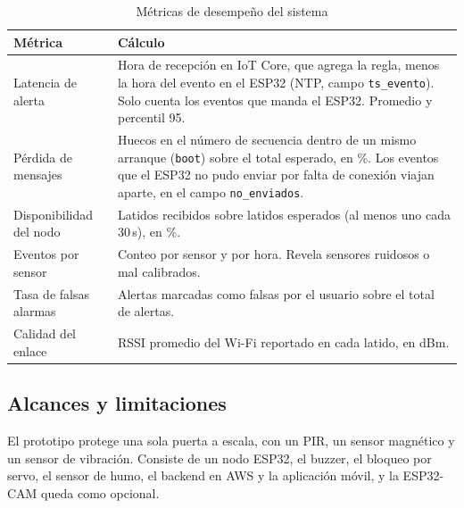 \documentclass[manuscript,screen,nonacm]{acmart}
\begin{document}
\begin{table}[htbp]
\centering
\caption{Métricas de desempeño del sistema}
\label{tab:metricas}
\footnotesize
\renewcommand{\arraystretch}{1.15}
\begin{tabular}{@{}L{3.2cm}L{9.8cm}@{}}
\toprule
\textbf{Métrica} & \textbf{Cálculo} \\
\midrule
Latencia de alerta & Hora de recepción en IoT Core, que agrega la regla, menos la hora del evento en el ESP32 (NTP, campo \texttt{ts\_evento}). Solo cuenta los eventos que manda el ESP32. Promedio y percentil 95. \\
Pérdida de mensajes & Huecos en el número de secuencia dentro de un mismo arranque (\texttt{boot}) sobre el total esperado, en \%. Los eventos que el ESP32 no pudo enviar por falta de conexión viajan aparte, en el campo \texttt{no\_enviados}. \\
Disponibilidad del nodo & Latidos recibidos sobre latidos esperados (al menos uno cada 30\,s), en \%. \\
Eventos por sensor & Conteo por sensor y por hora. Revela sensores ruidosos o mal calibrados. \\
Tasa de falsas alarmas & Alertas marcadas como falsas por el usuario sobre el total de alertas. \\
Calidad del enlace & RSSI promedio del Wi-Fi reportado en cada latido, en dBm. \\
\bottomrule
\end{tabular}
\end{table}

\subsection{Alcances y limitaciones}
El prototipo protege una sola puerta a escala, con un PIR, un sensor magnético y un sensor de vibración. Consiste de un nodo ESP32, el buzzer, el bloqueo por servo, el sensor de humo, el backend en AWS y la aplicación móvil, y la ESP32-CAM queda como opcional.
\end{document}

